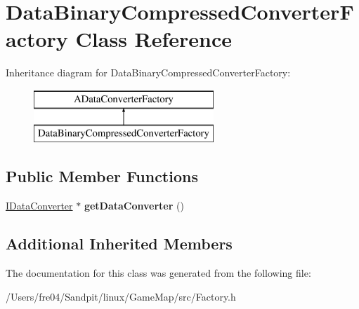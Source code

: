 \hypertarget{class_data_binary_compressed_converter_factory}{}\section{Data\+Binary\+Compressed\+Converter\+Factory Class Reference}
\label{class_data_binary_compressed_converter_factory}
Inheritance diagram for Data\+Binary\+Compressed\+Converter\+Factory\+:\begin{figure}[H]
\begin{center}
\leavevmode
\includegraphics[height=2.000000cm]{class_data_binary_compressed_converter_factory}
\end{center}
\end{figure}
\subsection*{Public Member Functions}
\begin{DoxyCompactItemize}
\item 
\hypertarget{class_data_binary_compressed_converter_factory_abec0071b44f75107d5895917e57062cc}{}\hyperlink{class_i_data_converter}{I\+Data\+Converter} $\ast$ {\bfseries get\+Data\+Converter} ()\label{class_data_binary_compressed_converter_factory_abec0071b44f75107d5895917e57062cc}

\end{DoxyCompactItemize}
\subsection*{Additional Inherited Members}


The documentation for this class was generated from the following file\+:\begin{DoxyCompactItemize}
\item 
/\+Users/fre04/\+Sandpit/linux/\+Game\+Map/src/Factory.\+h\end{DoxyCompactItemize}
